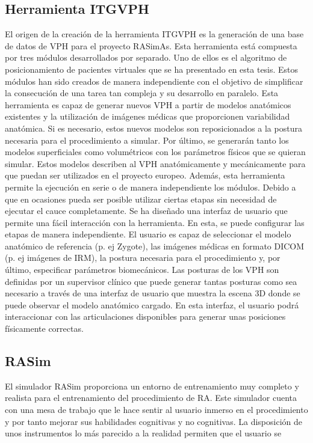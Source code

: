 \subsection{Herramienta ITGVPH}
\label{conclu:herramienta}
El origen de la creación de la herramienta  \ac{ITGVPH} es la generación de una base de datos de \ac{VPH} para el proyecto \ac{RASimAs}. Esta herramienta está compuesta por tres módulos desarrollados por separado. Uno de ellos es el algoritmo de posicionamiento de pacientes virtuales que se ha presentado en esta tesis. Estos módulos han sido creados de manera independiente con el objetivo de simplificar la consecución de una tarea tan compleja y su desarrollo en paralelo. Esta herramienta es capaz de generar nuevos \ac{VPH} a partir de modelos anatómicos existentes y la utilización de imágenes médicas que proporcionen variabilidad anatómica. Si es necesario, estos nuevos modelos son reposicionados a la postura necesaria para el procedimiento a simular. Por último, se generarán tanto los modelos superficiales como volumétricos con los parámetros físicos que se quieran simular. Estos modelos describen al \ac{VPH} anatómicamente y mecánicamente para que puedan ser utilizados en el proyecto europeo. Además, esta herramienta permite la ejecución en serie o de manera independiente los módulos. Debido a que en ocasiones pueda ser posible utilizar ciertas etapas sin necesidad de ejecutar el cauce completamente.
Se ha diseñado una interfaz de usuario que permite una fácil interacción con la herramienta. En esta, se puede configurar las etapas de manera independiente. El usuario es capaz de seleccionar el modelo anatómico de referencia (p. ej Zygote), las imágenes médicas en formato \ac{DICOM} (p. ej imágenes de \ac{IRM}), la postura necesaria para el procedimiento y, por último, especificar parámetros biomecánicos. 
Las posturas de los \ac{VPH} son definidas por un supervisor clínico que puede generar tantas posturas como sea necesario a través de una interfaz de usuario que muestra la escena 3D donde se puede observar el modelo anatómico cargado. En esta interfaz, el usuario podrá interaccionar con las articulaciones disponibles para generar unas posiciones físicamente correctas.

\subsection{RASim}
\label{conclu:rasim}
El simulador \ac{RASim} proporciona un entorno de entrenamiento muy completo y realista para el entrenamiento del procedimiento de \ac{RA}.  Este simulador cuenta con una mesa de trabajo que le hace sentir al usuario inmerso en el procedimiento y por tanto mejorar sus habilidades cognitivas y no cognitivas. La disposición de unos instrumentos lo más parecido a la realidad permiten que el usuario se 

